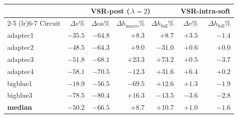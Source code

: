 \begin{tabular}{lrrrr|rr}
\toprule
& \multicolumn{4}{c|}{VSR-post (\,$\lambda{=}2$)} & \multicolumn{2}{c}{VSR-intra-soft} \\
\cmidrule(lr){2-5} \cmidrule(lr){6-7}
Circuit & $\Delta v$\% & $\Delta\text{oa}$\% & $\Delta h_{\text{macro}}$\% & $\Delta h_{\text{full}}$\% & $\Delta v$\% & $\Delta h_{\text{full}}$\% \\
\midrule
adaptec1 & $-35.5$ & $-64.8$ & $+8.3$ & $+8.7$ & $+3.5$ & $-1.4$ \\
adaptec2 & $-48.5$ & $-64.3$ & $+9.0$ & $-31.0$ & $+0.6$ & $+0.0$ \\
adaptec3 & $-51.8$ & $-68.1$ & $+23.3$ & $+73.2$ & $+0.5$ & $-3.7$ \\
adaptec4 & $-58.1$ & $-70.5$ & $-12.3$ & $+31.6$ & $+6.4$ & $+0.2$ \\
bigblue1 & $-18.9$ & $-56.5$ & $-69.5$ & $+12.6$ & $+1.3$ & $-1.9$ \\
bigblue3 & $-78.5$ & $-80.4$ & $+16.3$ & $-13.5$ & $-3.6$ & $-2.8$ \\
\midrule
\textbf{median} & $-50.2$ & $-66.5$ & $+8.7$ & $+10.7$ & $+1.0$ & $-1.6$ \\
\bottomrule
\end{tabular}
